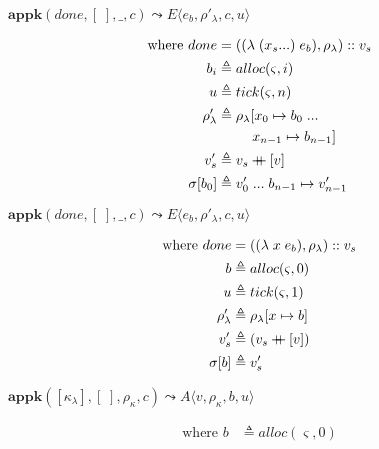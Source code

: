 \documentclass[12pt,draft]{article}
\newcommand\mdoubleplus{\ensuremath{\mathbin{+\mkern-9mu+}}}
\newcommand{\lamsyn}[2]{(\lambda\;(#1 ...)\;#2)}
\newcommand{\vararglamsyn}[2]{(\lambda\;#1\;#2)}
\begin{document}
\begin{multicols*}{2}
\vfill\null
\columnbreak


\begin{center}
  $\textbf{appk}(done, [\;], \_, c)
  \leadsto E\langle e_b , \rho'_\lambda , c , u \rangle$
\end{center}
\vspace{-7mm}
\begin{align*}
\text{where } done &= (\lamsyn{x_s}{e_b}, \rho_{\lambda}) :: v_s \\
b_i &\triangleq alloc(\varsigma, i) \\
u &\triangleq tick(\varsigma, n) \\
\rho'_{\lambda} &\triangleq \rho_{\lambda}[x_0 \mapsto b_0 \;... \\
&\;\;\;\;\;\;\;\;\;x_{n-1} \mapsto b_{n-1}] \\
v'_s &\triangleq v_s \mdoubleplus [v] \\
\sigma[b_0] &\triangleq v'_0 \;...\; b_{n-1} \mapsto v'_{n-1}
\end{align*}
\begin{center}
  $\textbf{appk}(done, [\;], \_, c)
  \leadsto E\langle e_b, \rho'_\lambda , c , u \rangle$
\end{center}
\vspace{-7mm}
\begin{align*}
\text{where } done &= (\vararglamsyn{x}{e_b}, \rho_{\lambda}) :: v_s \\
b &\triangleq alloc(\varsigma, 0) \\
u &\triangleq tick(\varsigma, 1) \\
\rho'_{\lambda} &\triangleq \rho_{\lambda}[x \mapsto b] \\
v'_s &\triangleq (v_s \mdoubleplus [v]) \\
\sigma[b] &\triangleq v'_s
\end{align*}
\begin{center}
  $\textbf{appk}([\kappa_\lambda] , [\;] , \rho_\kappa , c)
  \leadsto A\langle v , \rho_\kappa , b , u \rangle$
\end{center}
\vspace{-7mm}
\begin{align*}
\text{where } b &\triangleq alloc(\varsigma, 0) \\

\end{align*}
\end{multicols*}
\end{document}
